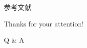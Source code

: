 \documentclass[9pt]{ctexbeamer}
\begin{document}
\appendix



\begin{frame}[allowframebreaks]{参考文献}
	
	 
\end{frame}

\begin{frame}
	\begin{center}
		{\Huge\calligra Thanks for your attention!}
		\vspace{1cm}
		
		{\Huge Q \& A}
	\end{center}
\end{frame}
\end{document}
